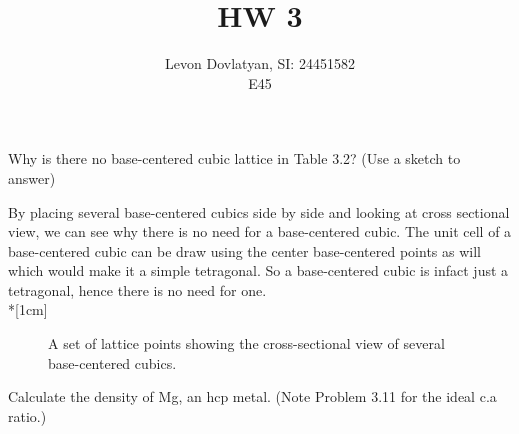 \documentclass[12pt]{article}
\newcommand{\slantedgrid}[4]{%
   \pgfmathtruncatemacro{\result}{#1+#3}
   \foreach \x in {#1,...,\result} \draw (\x,#2) -- ++(#4,#4);%
   \pgfmathtruncatemacro{\result}{#2+#4}
   \foreach \y in {#2,...,\result} \draw (#1+\y-#2,\y) -- ++(#3,0);%
 }
\newenvironment{problem}[2][Problem]{\begin{trivlist}
\item[\hskip \labelsep {\bfseries #1}\hskip \labelsep {\bfseries #2.}]}{\end{trivlist}}
\begin{document}
\providecommand{\e}[1]{\ensuremath{\times 10^{#1}}}
 
\title{HW 3}%
\author{Levon Dovlatyan, SI: 24451582\\ %
E45} %
 
\maketitle
 
\begin{problem}{3.3} %
Why is there no base-centered cubic lattice in Table 3.2? (Use a sketch to answer)
\end{problem}
 
By placing several base-centered cubics side by side and looking at cross sectional view, we can see why there is no need for a base-centered cubic. The unit cell of a base-centered cubic can be draw using the center base-centered points as will which would make it a simple tetragonal. So a base-centered cubic is infact just a tetragonal, hence there is no need for one. \\*[1cm]
 \begin{figure}[H]
 \centering
{}
\caption{A set of lattice points showing the cross-sectional view of several base-centered cubics.}
\end{figure}

\begin{problem}{3.7}
Calculate the density of Mg, an hcp metal. (Note Problem 3.11 for the ideal c.a ratio.)
\end{problem}
\end{document}
